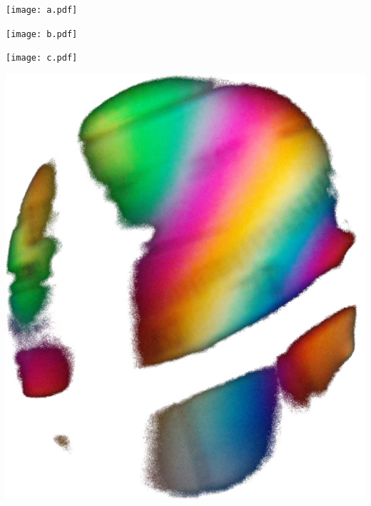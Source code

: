 

\hypersetup{
	pdftitle=
}

\title{}
\author{
	Martin Ueding \\
	\small{\href{mailto:mu@martin-ueding.de}{mu@martin-ueding.de}}
}

\pagestyle{empty}



\texttt{[image: a.pdf]}

\texttt{[image: b.pdf]}

\texttt{[image: c.pdf]}

\includegraphics[height=0.3\textheight]{Geodreieck.jpg}
